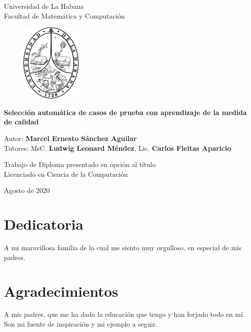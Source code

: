\documentclass[a4paper,openright,11pt,oneside]{book}
\begin{document}
	\begin{titlepage}
		\begin{center}
			\vspace*{-1in}
			Universidad de La Habana \\
			Facultad de Matemática y Computación \\
			\vspace*{0.15in}
			\begin{figure}[htb]
				\begin{center}
					\includegraphics[width=3cm]{./Graphics/uhlogo.pdf}
				\end{center}
			\end{figure}
			
			\vspace*{0.3in}
			\begin{large}
			\textbf{Selección automática de casos de prueba con aprendizaje de la medida de calidad} \\
			\end{large}
			\vspace*{0.6in}
			Autor: \textbf{Marcel Ernesto Sánchez Aguilar} \\
			Tutores: MsC. \textbf{Ludwig Leonard Méndez}, Lic. \textbf{Carlos Fleitas Aparicio}
			
			\vspace*{0.4in}
			Trabajo de Diploma presentado en opción al título\\
			Licenciado en Ciencia de la Computación
			
			\vspace*{0.5in}
			Agosto de 2020
			
		\end{center}
	\end{titlepage}
\chapter*{Dedicatoria}
A mi maravillosa familia de la cual me siento muy orgulloso, en especial de mis padres.

\chapter*{Agradecimientos}
A mis padres, que me ha dado la educación que tengo y han forjado todo en mí. Son mi fuente de inspiración y mi ejemplo a seguir.
\end{document}
